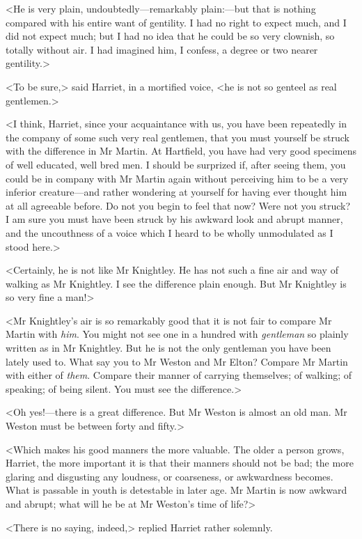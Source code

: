 <He is very plain, undoubtedly—remarkably plain:—but that is nothing compared with his entire want of gentility. I had no right to expect much, and I did not expect much; but I had no idea that he could be so very clownish, so totally without air. I had imagined him, I confess, a degree or two nearer gentility.>

<To be sure,> said Harriet, in a mortified voice, <he is not so genteel as real gentlemen.>

<I think, Harriet, since your acquaintance with us, you have been repeatedly in the company of some such very real gentlemen, that you must yourself be struck with the difference in Mr Martin. At Hartfield, you have had very good specimens of well educated, well bred men. I should be surprized if, after seeing them, you could be in company with Mr Martin again without perceiving him to be a very inferior creature—and rather wondering at yourself for having ever thought him at all agreeable before. Do not you begin to feel that now? Were not you struck? I am sure you must have been struck by his awkward look and abrupt manner, and the uncouthness of a voice which I heard to be wholly unmodulated as I stood here.>

<Certainly, he is not like Mr Knightley. He has not such a fine air and way of walking as Mr Knightley. I see the difference plain enough. But Mr Knightley is so very fine a man!>

<Mr Knightley's air is so remarkably good that it is not fair to compare Mr Martin with \textit{him}. You might not see one in a hundred with \textit{gentleman} so plainly written as in Mr Knightley. But he is not the only gentleman you have been lately used to. What say you to Mr Weston and Mr Elton? Compare Mr Martin with either of \textit{them}. Compare their manner of carrying themselves; of walking; of speaking; of being silent. You must see the difference.>

<Oh yes!—there is a great difference. But Mr Weston is almost an old man. Mr Weston must be between forty and fifty.>

<Which makes his good manners the more valuable. The older a person grows, Harriet, the more important it is that their manners should not be bad; the more glaring and disgusting any loudness, or coarseness, or awkwardness becomes. What is passable in youth is detestable in later age. Mr Martin is now awkward and abrupt; what will he be at Mr Weston's time of life?>

<There is no saying, indeed,> replied Harriet rather solemnly.

